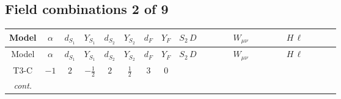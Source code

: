 \documentclass[8pt]{article}
\begin{document}
\begin{landscape}
\subsection*{Field combinations 2 of 9}
\begin{longtable}{@{}cccccccc >{\raggedright\arraybackslash}p{0.21\linewidth} >{\raggedright\arraybackslash}p{0.21\linewidth} >{\raggedright\arraybackslash}p{0.21\linewidth}@{}}
\toprule
Model & $\alpha$ & $d_{S_1}$ & $Y_{S_1}$ & $d_{S_2}$ & $Y_{S_2}$ & $d_F$ & $Y_F$ & $S_2\,D$ & $W_{\mu\nu}$ & $H\,\ell$ \\
\midrule
\endfirsthead
\toprule
Model & $\alpha$ & $d_{S_1}$ & $Y_{S_1}$ & $d_{S_2}$ & $Y_{S_2}$ & $d_F$ & $Y_F$ & $S_2\,D$ & $W_{\mu\nu}$ & $H\,\ell$ \\
\midrule
\endhead
T3-C & $-1$ & $2$ & $-\frac{1}{2}$ & $2$ & $\frac{1}{2}$ & $3$ & $0$ & \scriptsize\adjustbox{max width=\linewidth}{$\begin{gathered} +D_{\mu _1}\left(S_{2,j_1}\right){}^{\dagger } D_{\mu _1}\left(S_{2,j_1}\right)\end{gathered}$} & \scriptsize\adjustbox{max width=\linewidth}{$\begin{gathered} -\frac{\hbar  \left(W_{\mu _1\mu _2}^{A_1}\right){}^2}{\epsilon }\end{gathered}$} & \scriptsize\adjustbox{max width=\linewidth}{$\begin{gathered} -\frac{2 \hbar  \overline{y_{1,i_1,r_1}} \overline{y_{2,i_2,r_1}} L_{a_4,i_2}{}^T\, C\, P_L\, L_{a_2,i_1} H_{a_1} H_{a_3} \lambda_5 \epsilon_{a_1,a_2} \epsilon_{a_3,a_4}}{3 \epsilon  M_F} \\ -\frac{2 \hbar  \overline{y_{1,i_1,r_1}} \overline{y_{2,i_2,r_1}} L_{a_4,i_2}{}^T\, C\, P_L\, L_{a_2,i_1} H_{a_1} H_{a_3} \lambda_5 \epsilon_{a_1,a_2} \epsilon_{a_3,a_4}}{3 M_F} \\ -\frac{2 \hbar  \overline{\lambda_5} \overline{L_{a_3,i_1}}\, C\, P_R\, \overline{L_{a_4,i_2}}{}^T y_{1,i_1,r_1} y_{2,i_2,r_1} \epsilon_{a_1,a_3} \epsilon_{a_2,a_4} H_{a_1}{}^{\dagger } H_{a_2}{}^{\dagger }}{3 \epsilon  M_F}\end{gathered}$} \\
\textit{cont.} &  &  &  &  &  &  &  &  &  & \scriptsize\adjustbox{max width=\linewidth}{$\begin{gathered} -\frac{2 \hbar  \overline{\lambda_5} \overline{L_{a_3,i_1}}\, C\, P_R\, \overline{L_{a_4,i_2}}{}^T y_{1,i_1,r_1} y_{2,i_2,r_1} \epsilon_{a_1,a_3} \epsilon_{a_2,a_4} H_{a_1}{}^{\dagger } H_{a_2}{}^{\dagger }}{3 M_F}\end{gathered}$} \\
\midrule
\bottomrule
\end{longtable}
\clearpage

\end{landscape}
\end{document}
